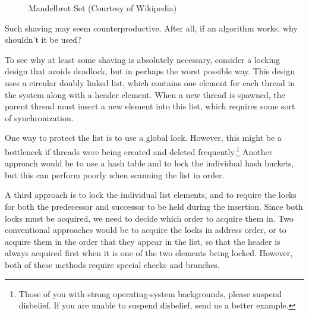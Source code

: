 \begin{figure}[htb]
\centering
{}
\caption{Mandelbrot Set (Courtesy of Wikipedia)}
\label{fig:easy:Mandelbrot Set}
\end{figure}

Such shaving may seem counterproductive.
After all, if an algorithm works, why shouldn't it be used?

To see why at least some shaving is absolutely necessary, consider
a locking design that avoids deadlock, but in perhaps the worst possible way.
This design uses a circular doubly linked list, which contains one
element for each thread in the system along with a header element.
When a new thread is spawned, the parent thread must insert a new
element into this list, which requires some sort of synchronization.

One way to protect the list is to use a global lock.
However, this might be a bottleneck if threads were being created and
deleted frequently.\footnote{
	Those of you with strong operating-system backgrounds, please
	suspend disbelief.
	If you are unable to suspend disbelief, send us a better example.}
Another approach would be to use a hash table and to lock the individual
hash buckets, but this can perform poorly when scanning the list in order.

A third approach is to lock the individual list elements, and to require
the locks for both the predecessor and successor to be held during the
insertion.
Since both locks must be acquired, we need to decide which order to
acquire them in.
Two conventional approaches would be to acquire the locks in address
order, or to acquire them in the order that they appear in the list,
so that the header is always acquired first when it is one of the two
elements being locked.
However, both of these methods require special checks and branches.

